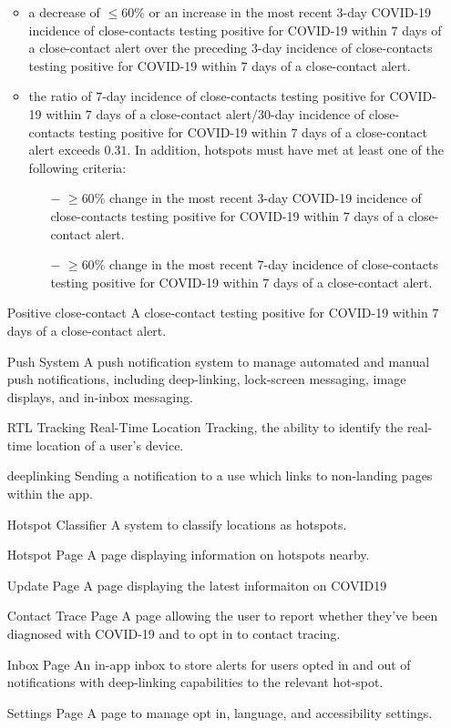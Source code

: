 \documentclass{scrreprt}
\begin{document}
\begin{itemize}
\begin{itemize}
	\item a decrease of $\leq 60\%$ or an increase in the most recent $3$-day COVID-19 incidence of close-contacts testing positive for COVID-19 within $7$ days of a close-contact alert over the preceding $3$-day incidence of close-contacts testing positive for COVID-19 within $7$ days of a close-contact alert. 
	\item the ratio of $7$-day incidence of close-contacts testing positive for COVID-19 within $7$ days of a close-contact alert/$30$-day incidence of close-contacts testing positive for COVID-19 within $7$ days of a close-contact alert exceeds $0.31$. In addition, hotspots must have met at least one of the following criteria: 
	\begin{itemize}
		\item[$-$] $\geq 60\%$ change in the most recent 3-day COVID-19 incidence of close-contacts testing positive for COVID-19 within $7$ days of a close-contact alert.
		\item[$-$]$\geq 60\%$ change in the most recent 7-day incidence of close-contacts testing positive for COVID-19 within $7$ days of a close-contact alert.
	\end{itemize}
\end{itemize}
\item[Positive close-contact] A close-contact testing positive for COVID-19 within $7$ days of a close-contact alert.
\item[Push System] A push notification system to manage automated and manual push notifications, including deep-linking, lock-screen messaging, image displays, and in-inbox messaging.
\item [RTL Tracking] Real-Time Location Tracking, the ability to identify the real-time location of a user's device.
\item[deeplinking] Sending a notification to a use which links to non-landing pages within the app.
\item[Hotspot Classifier] A system to classify locations as hotspots.
\item[Hotspot Page] A page displaying information on hotspots nearby.
\item[Update Page] A page displaying the latest informaiton on COVID19
\item[Contact Trace Page] A page allowing the user to report whether they've been diagnosed with COVID-19 and to opt in to contact tracing.
\item[Inbox Page] An in-app inbox to store alerts for users opted in and out of notifications with deep-linking capabilities to the relevant hot-spot.
\item[Settings Page] A page to manage opt in, language, and accessibility settings.
\end{itemize}
\end{document}
